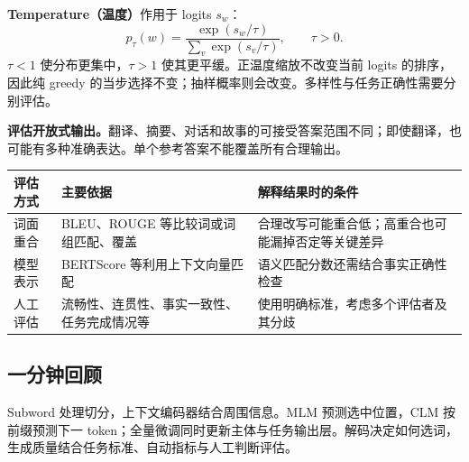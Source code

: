 \textbf{Temperature（温度）}作用于 logits $s_w$：
\[
 p_\tau(w)=\frac{\exp(s_w/\tau)}{\sum_v\exp(s_v/\tau)},\qquad\tau>0.
\]
$\tau<1$ 使分布更集中，$\tau>1$ 使其更平缓。正温度缩放不改变当前 logits 的排序，因此纯 greedy 的当步选择不变；抽样概率则会改变。多样性与任务正确性需要分别评估。

\textbf{评估开放式输出。}翻译、摘要、对话和故事的可接受答案范围不同；即使翻译，也可能有多种准确表达。单个参考答案不能覆盖所有合理输出。

\begin{center}
\small
\begin{tabularx}{\textwidth}{@{}lXX@{}}
\toprule
评估方式 & 主要依据 & 解释结果时的条件 \\
\midrule
词面重合 & BLEU、ROUGE 等比较词或词组匹配、覆盖 & 合理改写可能重合低；高重合也可能漏掉否定等关键差异 \\
模型表示 & BERTScore 等利用上下文向量匹配 & 语义匹配分数还需结合事实正确性检查 \\
人工评估 & 流畅性、连贯性、事实一致性、任务完成情况等 & 使用明确标准，考虑多个评估者及其分歧 \\
\bottomrule
\end{tabularx}
\end{center}

\subsection*{一分钟回顾}

Subword 处理切分，上下文编码器结合周围信息。MLM 预测选中位置，CLM 按前缀预测下一 token；全量微调同时更新主体与任务输出层。解码决定如何选词，生成质量结合任务标准、自动指标与人工判断评估。
\endgroup
